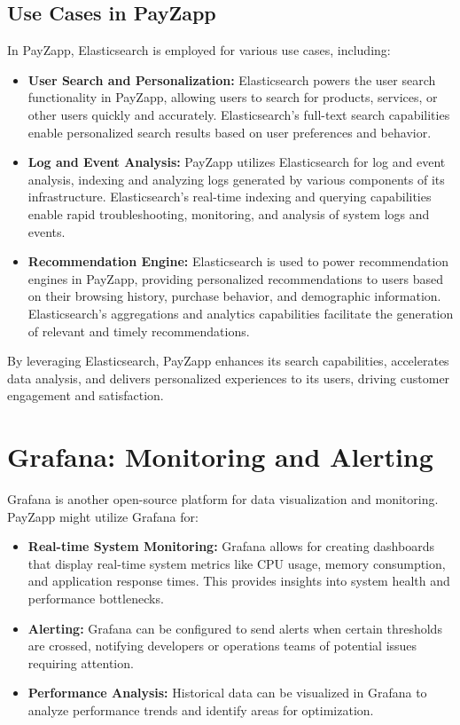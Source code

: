 \documentclass[12pt,a4paper]{report}
\begin{document}
\subsection{Use Cases in PayZapp}

In PayZapp, Elasticsearch is employed for various use cases, including:

\begin{itemize}
    \item \textbf{User Search and Personalization:} Elasticsearch powers the user search functionality in PayZapp, allowing users to search for products, services, or other users quickly and accurately. Elasticsearch's full-text search capabilities enable personalized search results based on user preferences and behavior.
    
    \item \textbf{Log and Event Analysis:} PayZapp utilizes Elasticsearch for log and event analysis, indexing and analyzing logs generated by various components of its infrastructure. Elasticsearch's real-time indexing and querying capabilities enable rapid troubleshooting, monitoring, and analysis of system logs and events.
    
    \item \textbf{Recommendation Engine:} Elasticsearch is used to power recommendation engines in PayZapp, providing personalized recommendations to users based on their browsing history, purchase behavior, and demographic information. Elasticsearch's aggregations and analytics capabilities facilitate the generation of relevant and timely recommendations.
\end{itemize}

By leveraging Elasticsearch, PayZapp enhances its search capabilities, accelerates data analysis, and delivers personalized experiences to its users, driving customer engagement and satisfaction.


\section{Grafana: Monitoring and Alerting}

Grafana is another open-source platform for data visualization and monitoring. PayZapp might utilize Grafana for:

\begin{itemize}
    \item \textbf{Real-time System Monitoring:} Grafana allows for creating dashboards that display real-time system metrics like CPU usage, memory consumption, and application response times. This provides insights into system health and performance bottlenecks.
    
    \item \textbf{Alerting:} Grafana can be configured to send alerts when certain thresholds are crossed, notifying developers or operations teams of potential issues requiring attention.
    
    \item \textbf{Performance Analysis:} Historical data can be visualized in Grafana to analyze performance trends and identify areas for optimization.
\end{itemize}
\end{document}
